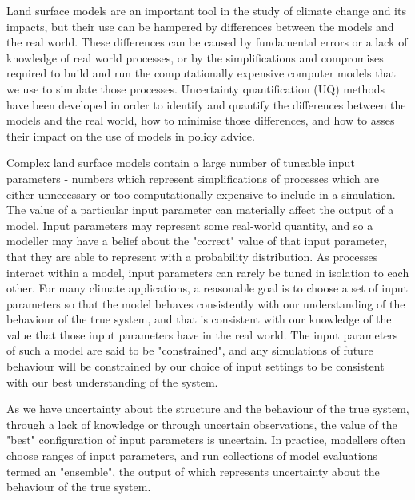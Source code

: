 \documentclass[gmd, manuscript]{copernicus}
\begin{document}

\introduction\label{sec:introduction}  %

Land surface models are an important tool in the study of climate change and its impacts, but their use can be hampered by differences between the models and the real world. These differences can be caused by fundamental errors or a lack of knowledge of real world processes, or by the simplifications and compromises required to build and run the computationally expensive computer models that we use to simulate those processes. Uncertainty quantification (UQ) methods have been developed in order to identify and quantify the differences between the models and the real world, how to minimise those differences, and how to asses their impact on the use of models in policy advice.

Complex land surface models contain a large number of tuneable input parameters - numbers which represent simplifications of processes which are either unnecessary or too computationally expensive to include in a simulation. The value of a particular input parameter can materially affect the output of a model. Input parameters may represent some real-world quantity, and so a modeller may have a belief about the "correct" value of that input parameter, that they are able to represent with a probability distribution. As processes interact within a model, input parameters can rarely be tuned in isolation to each other. For many climate applications, a reasonable goal is to choose a set of input parameters so that the model behaves consistently with our understanding of the behaviour of the true system, and that is consistent with our knowledge of the value that those input parameters have in the real world. The input parameters of such a model are said to be "constrained", and any simulations of future behaviour will be constrained by our choice of input settings to be consistent with our best understanding of the system.

As we have uncertainty about the structure and the behaviour of the true system, through a lack of knowledge or through uncertain observations, the value of the "best" configuration of input parameters is uncertain. In practice, modellers often choose ranges of input parameters, and run collections of model evaluations termed an "ensemble", the output of which represents uncertainty about the behaviour of the true system.
\end{document}

